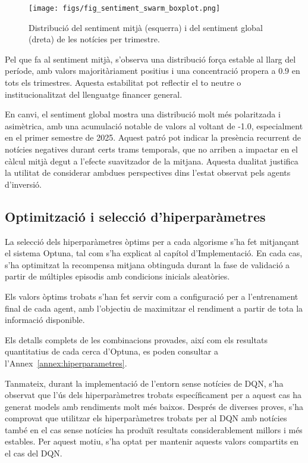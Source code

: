 \documentclass[12pt,a4paper,twoside]{book}
\begin{document}
\begin{figure}[H]
	\centering
	\texttt{[image: figs/fig\_sentiment\_swarm\_boxplot.png]}
	\caption{Distribució del sentiment mitjà (esquerra) i del sentiment global (dreta) de les notícies per trimestre.}
	\label{fig:sentiment-violin}
\end{figure}

Pel que fa al sentiment mitjà, s’observa una distribució força estable al llarg del període, amb valors majoritàriament positius i una concentració propera a 0.9 en tots els trimestres. Aquesta estabilitat pot reflectir el to neutre o institucionalitzat del llenguatge financer general.

En canvi, el sentiment global mostra una distribució molt més polaritzada i asimètrica, amb una acumulació notable de valors al voltant de -1.0, especialment en el primer semestre de 2025. Aquest patró pot indicar la presència recurrent de notícies negatives durant certs trams temporals, que no arriben a impactar en el càlcul mitjà degut a l’efecte suavitzador de la mitjana. Aquesta dualitat justifica la utilitat de considerar ambdues perspectives dins l’estat observat pels agents d’inversió.


\subsection{Optimització i selecció d’hiperparàmetres}

La selecció dels hiperparàmetres òptims per a cada algorisme s’ha fet mitjançant el sistema Optuna, tal com s’ha explicat al capítol d’Implementació. En cada cas, s’ha optimitzat la recompensa mitjana obtinguda durant la fase de validació a partir de múltiples episodis amb condicions inicials aleatòries.

Els valors òptims trobats s’han fet servir com a configuració per a l’entrenament final de cada agent, amb l’objectiu de maximitzar el rendiment a partir de tota la informació disponible.

Els detalls complets de les combinacions provades, així com els resultats quantitatius de cada cerca d’Optuna, es poden consultar a l’Annex~\ref{annex:hiperparametres}.

Tanmateix, durant la implementació de l’entorn sense notícies de DQN, s’ha observat que l’ús dels hiperparàmetres trobats específicament per a aquest cas ha generat models amb rendiments molt més baixos. Després de diverses proves, s’ha comprovat que utilitzar els hiperparàmetres trobats per al DQN amb notícies també en el cas sense notícies ha produït resultats considerablement millors i més estables. Per aquest motiu, s’ha optat per mantenir aquests valors compartits en el cas del DQN.
\end{document}
